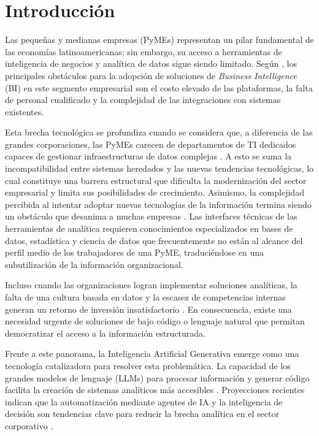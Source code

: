\section{Introducción}

Las pequeñas y medianas empresas (PyMEs) representan un pilar fundamental de las
economías latinoamericanas; sin embargo, su acceso a herramientas de inteligencia
de negocios y analítica de datos sigue siendo limitado. Según
\citet{tovar2011bi}, los principales obstáculos para la adopción de soluciones
de \textit{Business Intelligence} (BI) en este segmento empresarial son el costo
elevado de las plataformas, la falta de personal cualificado y la complejidad de
las integraciones con sistemas existentes.

Esta brecha tecnológica se profundiza cuando se considera que, a diferencia de
las grandes corporaciones, las PyMEs carecen de departamentos de TI dedicados
capaces de gestionar infraestructuras de datos complejas
\citep{cordero2020sistemas}. A esto se suma la incompatibilidad entre sistemas
heredados y las nuevas tendencias tecnológicas, lo cual constituye una barrera
estructural que dificulta la modernización del sector empresarial y limita sus
posibilidades de crecimiento. Asimismo, la complejidad percibida al intentar adoptar
nuevas tecnologías de la información termina siendo un obstáculo que desanima a
muchas empresas \citep{nurqamarani2021complejidad}. Las interfaces técnicas de
las herramientas de analítica requieren conocimientos especializados en bases de
datos, estadística y ciencia de datos que frecuentemente no están al alcance del
perfil medio de los trabajadores de una PyME, traduciéndose en una subutilización
de la información organizacional.

Incluso cuando las organizaciones logran implementar soluciones analíticas, la
falta de una cultura basada en datos y la escasez de competencias internas
generan un retorno de inversión insatisfactorio \citep{wamba2017desafios}. En
consecuencia, existe una necesidad urgente de soluciones de bajo código o
lenguaje natural que permitan democratizar el acceso a la información
estructurada.

Frente a este panorama, la Inteligencia Artificial Generativa emerge como una
tecnología catalizadora para resolver esta problemática. La capacidad de los
grandes modelos de lenguaje (LLMs) para procesar información y generar código
facilita la creación de sistemas analíticos más accesibles
\citep{barbon2024generative}. Proyecciones recientes indican que la
automatización mediante agentes de IA y la inteligencia de decisión son
tendencias clave para reducir la brecha analítica en el sector corporativo
\citep{gartner2025predicciones}.

